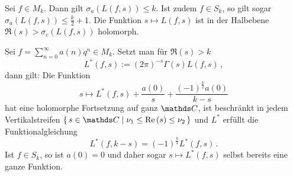 \begin{koro}
Sei $f \in M_k$. Dann gilt $\sigma_a (L(f,s)) \leq k$. Ist zudem $f \in S_k$, so gilt sogar $\sigma_a (L(f,s)) \leq \frac k2 + 1$. Die Funktion $s \mapsto L(f,s)$ ist in der Halbebene $\Re(s) > \sigma_c (L(f,s))$ holomorph.
\end{koro}

\begin{satz}[Hecke]\label{satz:hecke}
Sei $f = \sum_{n=0}^\infty a(n) q^n \in M_k$. Setzt man für $\Re(s) > k$
\[
	L^*(f,s) := (2\pi)^{-s} \Gamma(s) L(f,s)
	\,,
\]
dann gilt: Die Funktion 
\[
	s \mapsto L^*(f,s) + \frac {a(0)}s + \frac {(-1)^{\frac k2} a(0)}{k-s}
\]
hat eine holomorphe Fortsetzung auf ganz $\CC$, ist beschränkt in jedem Vertikalstreifen $\Set {s \in \CC \mid \nu_1 \leq \Re(s) \leq \nu_2}$ und $L^*$ erfüllt die Funktionalgleichung
\[
	L^*(f,k-s) = (-1)^{\frac k2} L^*(f,s)
	\,.
\]
Ist $f \in S_k$, so ist $a(0) = 0$ und daher sogar $s \mapsto L^*(f,s)$ selbst bereits eine ganze Funktion.
\end{satz}

